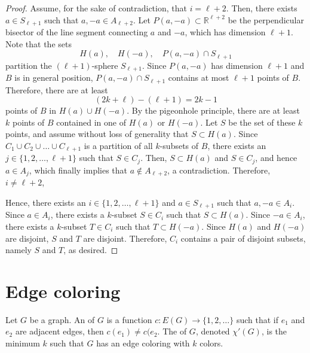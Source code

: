\begin{proof}
    Assume, for the sake of contradiction, that \(i = \ell + 2\).
    Then, there exists \(a \in S_{\ell + 1}\)
    such that \(a, -a \in A_{\ell + 2}\).
    Let \(P(a, -a) \subset \mathbb{R}^{\ell + 2}\) be the perpendicular bisector of the line segment connecting \(a\) and \(-a\),
    which has dimension \(\ell + 1\).
    Note that the sets
    \begin{equation}
        H(a), \quad H(-a), \quad P(a, -a) \cap S_{\ell + 1}
    \end{equation}
    partition the \((\ell + 1)\)-sphere \(S_{\ell + 1}\).
    Since \(P(a, -a)\) has dimension \(\ell + 1\) and \(B\) is in general position,
    \(P(a, -a) \cap S_{\ell + 1}\) contains at most \(\ell + 1\) points of \(B\).
    Therefore, there are at least
    \begin{equation}
        (2k + \ell) - (\ell + 1) = 2k - 1
    \end{equation}
    points of \(B\) in \(H(a) \cup H(-a)\).
    By the pigeonhole principle,
    there are at least \(k\) points of \(B\) contained in one of \(H(a)\) or \(H(-a)\).
    Let \(S\) be the set of these \(k\) points, and assume without loss of generality that \(S \subset H(a)\).
    Since \(C_1 \cup C_2 \cup \dots \cup C_{\ell + 1}\) is a partition of all \(k\)-subsets of \(B\),
    there exists an \(j \in \{1, 2, \dots, \ell + 1\}\) such that \(S \in C_j\).
    Then, \(S \subset H(a)\) and \(S \in C_j\), and hence \(a \in A_j\),
    which finally implies that \(a \notin A_{\ell + 2}\),
    a contradiction.
    Therefore, \(i \neq \ell + 2\),

    Hence, there exists an \(i \in \{1, 2, \dots, \ell + 1\}\)
    and \(a \in S_{\ell + 1}\) such that \(a, -a \in A_i\).
    Since \(a \in A_i\),
    there exists a \(k\)-subset \(S \in C_i\) such that \(S \subset H(a)\).
    Since \(-a \in A_i\),
    there exists a \(k\)-subset \(T \in C_i\) such that \(T \subset H(-a)\).
    Since \(H(a)\) and \(H(-a)\) are disjoint,
    \(S\) and \(T\) are disjoint.
    Therefore, \(C_i\) contains a pair of disjoint subsets, namely \(S\) and \(T\), as desired.
\end{proof}


\section{Edge coloring}

\begin{definition}
    Let \(G\) be a graph.
    An  of \(G\) is a function
    \(
        c \colon E(G) \to \{1, 2, \ldots\}
    \)
    such that if \(e_1\) and \(e_2\) are adjacent edges,
    then \(c(e_1) \neq c(e_2\).
    The  of \(G\),
    denoted \(\chi'(G)\),
    is the minimum \(k\) such that \(G\) has an edge coloring with \(k\) colors.
\end{definition}

